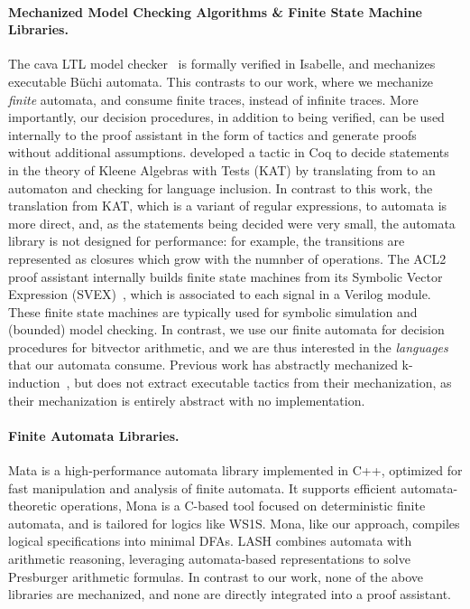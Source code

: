 \paragraph{Mechanized Model Checking Algorithms \& Finite State Machine Libraries.}
The cava LTL model checker~\cite{gregoire2005proving} is formally verified in Isabelle,
and mechanizes executable B\"uchi automata.
This contrasts to our work, where we mechanize \emph{finite} automata,
and consume finite traces, instead of infinite traces.
%
More importantly, our decision procedures, in addition to being verified, can be
used internally to the proof assistant in the form of tactics and generate
proofs without additional assumptions.
%
\citet{kat-pous} developed a tactic in Coq to decide statements in the theory of
Kleene Algebras with Tests (KAT) by translating from to an automaton and
checking for language inclusion.
%
In contrast to this work, the translation from KAT, which is a variant of
regular expressions, to automata is more direct, and, as the statements being
decided were very small, the automata library is not designed for performance:
for example, the transitions are represented as closures which grow with the
numnber of operations.
%
The ACL2 proof assistant internally builds finite state machines from its
Symbolic Vector Expression (SVEX)~\cite{hunt2017industrial}, which is associated to each signal in a Verilog module.
These finite state machines are typically used for symbolic simulation and (bounded) model checking.
In contrast, we use our finite automata for decision procedures for bitvector arithmetic,
and we are thus interested in the \emph{languages} that our automata consume.
Previous work has abstractly mechanized k-induction~\cite{ishii2020formalizing},
but does not extract executable tactics from their mechanization,
as their mechanization is entirely abstract with no implementation.

\paragraph{Finite Automata Libraries.}
Mata \cite{chocholaty2024mata} is a high-performance automata library implemented in C++, optimized for fast manipulation and analysis of finite automata. It supports efficient automata-theoretic operations,
Mona \cite{henriksen1995mona} is a C-based tool focused on deterministic finite automata, and is tailored for logics like WS1S. Mona, like our approach, compiles logical specifications into minimal DFAs.
LASH \cite{boigelot2004counting} combines automata with arithmetic reasoning, leveraging automata-based representations to solve Presburger arithmetic formulas.
In contrast to our work, none of the above libraries are mechanized, and none are directly integrated into a proof assistant.


